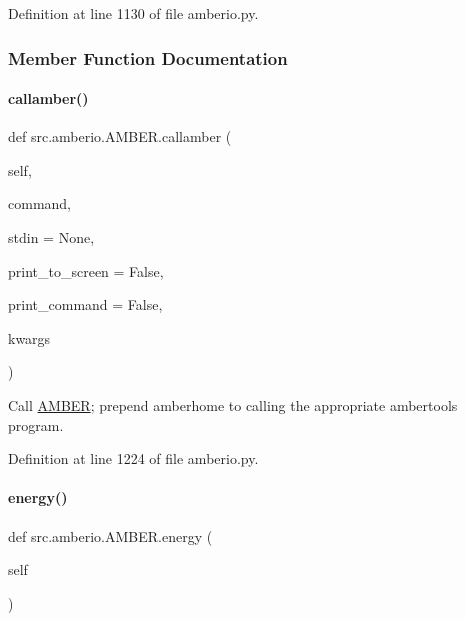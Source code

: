 Definition at line 1130 of file amberio.\+py.



\subsubsection{Member Function Documentation}
\mbox{\label{classsrc_1_1amberio_1_1AMBER_a4fa14e4e3ccc8936084020563bf86e53}} 
\paragraph{\texorpdfstring{callamber()}{callamber()}}
{\footnotesize\ttfamily def src.\+amberio.\+A\+M\+B\+E\+R.\+callamber (\begin{DoxyParamCaption}\item[{}]{self,  }\item[{}]{command,  }\item[{}]{stdin = {\ttfamily None},  }\item[{}]{print\+\_\+to\+\_\+screen = {\ttfamily False},  }\item[{}]{print\+\_\+command = {\ttfamily False},  }\item[{}]{kwargs }\end{DoxyParamCaption})}



Call \hyperlink{classsrc_1_1amberio_1_1AMBER}{A\+M\+B\+ER}; prepend amberhome to calling the appropriate ambertools program. 



Definition at line 1224 of file amberio.\+py.

\mbox{\label{classsrc_1_1amberio_1_1AMBER_a7d4ea449a1f78e9795b323547734a217}} 
\paragraph{\texorpdfstring{energy()}{energy()}}
{\footnotesize\ttfamily def src.\+amberio.\+A\+M\+B\+E\+R.\+energy (\begin{DoxyParamCaption}\item[{}]{self }\end{DoxyParamCaption})}



